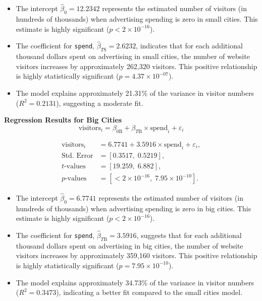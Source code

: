 \documentclass{article}
\begin{document}
\begin{itemize}
  \item The intercept \(\hat{\beta}_0 = 12.2342\) represents the estimated number of visitors (in hundreds of thousands) when advertising spending is zero in small cities. This estimate is highly significant (\(p < 2 \times 10^{-16}\)).
  \item The coefficient for \texttt{spend}, \(\hat{\beta}_{T \text{S}} = 2.6232\), indicates that for each additional thousand dollars spent on advertising in small cities, the number of website visitors increases by approximately 262,320 visitors. This positive relationship is highly statistically significant (\(p = 4.37 \times 10^{-07}\)).
  \item The model explains approximately 21.31\% of the variance in visitor numbers (\(R^2 = 0.2131\)), suggesting a moderate fit.
\end{itemize}

\textbf{Regression Results for Big Cities}
$$
\text{visitors}_i = \beta_{0 \text{B}} + \beta_{T \text{B}} \times \text{spend}_i + \varepsilon_i
$$

\[
\begin{aligned}
\text{visitors}_i &= 6.7741 + 3.5916 \times \text{spend}_i + \varepsilon_i, \\
\text{Std. Error} &= [0.3517, \; 0.5219], \\
t\text{-values} &= [19.259, \; 6.882], \\
p\text{-values} &= [<2 \times 10^{-16}, \; 7.95 \times 10^{-10}].
\end{aligned}
\]

\begin{itemize}
  \item The intercept \(\hat{\beta}_0 = 6.7741\) represents the estimated number of visitors (in hundreds of thousands) when advertising spending is zero in big cities. This estimate is highly significant (\(p < 2 \times 10^{-16}\)).
  \item The coefficient for \texttt{spend}, \(\hat{\beta}_{T \text{B}} = 3.5916\), suggests that for each additional thousand dollars spent on advertising in big cities, the number of website visitors increases by approximately 359,160 visitors. This positive relationship is highly statistically significant (\(p = 7.95 \times 10^{-10}\)).
  \item The model explains approximately 34.73\% of the variance in visitor numbers (\(R^2 = 0.3473\)), indicating a better fit compared to the small cities model.
\end{itemize}
\end{document}
